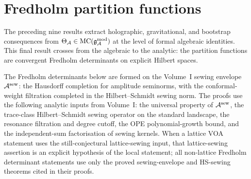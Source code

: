 %

\providecommand{\Bergman}{\mathcal{B}}
\providecommand{\Fock}{\mathcal{F}}
\providecommand{\Hilb}{\mathcal{H}\!\mathit{ilb}}
\providecommand{\sewop}{T}
\providecommand{\sewker}{K}
\providecommand{\trcl}{\mathcal{L}^1}
\providecommand{\hscl}{\mathcal{L}^2}
\providecommand{\freddet}{\mathrm{det}_{\mathrm{Fred}}}
\providecommand{\Wick}{\mathcal{W}}
\providecommand{\Bergker}{\mathsf{B}}
\providecommand{\primeform}{E}
\providecommand{\collar}{\mathfrak{c}}
\providecommand{\sewenv}{\cA^{\mathrm{sew}}}
\providecommand{\anbar}{\barB^{\mathrm{an}}}
\providecommand{\algcore}{\cA_{\mathrm{alg}}}
\providecommand{\codercat}{D^{\mathrm{co}}}
\providecommand{\contrcat}{D^{\mathrm{ctr}}}
\providecommand{\graphnorm}{\|\cdot\|_{\mathrm{graph}}}
\providecommand{\secquant}{\Gamma}
\providecommand{\hodgebdle}{\mathbb{E}}
\providecommand{\hodgedet}{\det\hodgebdle}
\providecommand{\zetareg}{\det\nolimits'_\zeta}
\providecommand{\dedeta}{\eta}
\providecommand{\Sp}{\mathrm{Sp}}
\providecommand{\Siegel}{\mathfrak{H}}
\providecommand{\OPEcoeff}{C}

\section{Fredholm partition functions}

The preceding nine results extract holographic, gravitational,
and bootstrap consequences from $\Theta_{\mathcal{A}} \in \mathrm{MC}(\mathfrak{g}_{\mathcal{A}}^{\mathrm{mod}})$ at
the level of formal algebraic identities. This final result
crosses from the algebraic to the analytic: the partition
functions are convergent Fredholm determinants on explicit
Hilbert spaces.

\begin{remark}
The Fredholm determinants below are formed on the Volume~I sewing
envelope \(\sewenv\): the Hausdorff completion for amplitude
seminorms, with the conformal-weight filtration completed in the
Hilbert--Schmidt sewing norm.  The proofs use the following analytic
inputs from Volume~I: the universal property of \(\sewenv\), the
trace-class Hilbert--Schmidt sewing operator on the standard landscape,
the resonance filtration and degree cutoff, the OPE polynomial-growth
bound, and the independent-sum factorisation of sewing kernels.  When a
lattice VOA statement uses the still-conjectural lattice-sewing input,
that lattice-sewing assertion is an explicit hypothesis of the local
statement; all non-lattice Fredholm determinant statements use only the
proved sewing-envelope and HS-sewing theorems cited in their proofs.
\end{remark}

